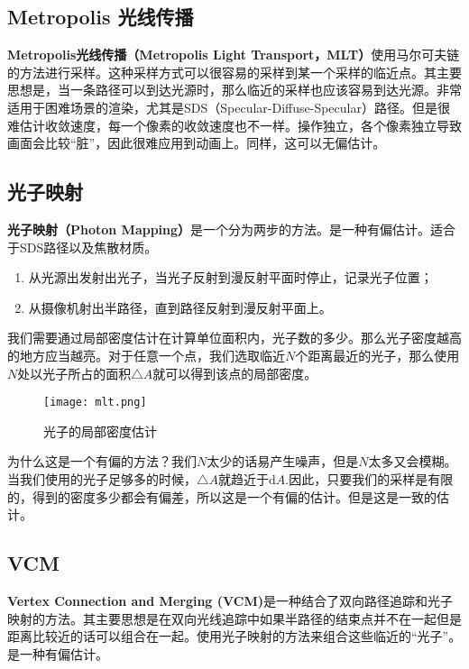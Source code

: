 \documentclass[openany]{progbookcn}
\begin{document}
\subsection{Metropolis 光线传播}

\textbf{Metropolis光线传播（Metropolis Light Transport，MLT）}使用马尔可夫链的方法进行采样。这种采样方式可以很容易的采样到某一个采样的临近点。其主要思想是，当一条路径可以到达光源时，那么临近的采样也应该容易到达光源。非常适用于困难场景的渲染，尤其是SDS（Specular-Diffuse-Specular）路径。但是很难估计收敛速度，每一个像素的收敛速度也不一样。操作独立，各个像素独立导致画面会比较``脏”，因此很难应用到动画上。同样，这可以无偏估计。

\subsection{光子映射}

\textbf{光子映射（Photon Mapping）}是一个分为两步的方法。是一种有偏估计。适合于SDS路径以及焦散材质。
\begin{enumerate}
	\item 从光源出发射出光子，当光子反射到漫反射平面时停止，记录光子位置；
	\item 从摄像机射出半路径，直到路径反射到漫反射平面上。
\end{enumerate}

我们需要通过局部密度估计在计算单位面积内，光子数的多少。那么光子密度越高的地方应当越亮。对于任意一个点，我们选取临近$N$个距离最近的光子，那么使用$N$处以光子所占的面积$\triangle A$就可以得到该点的局部密度。

\begin{figure}[H]
	\centering
	\texttt{[image: mlt.png]}
	\caption{光子的局部密度估计}
	\label{fig:mlt}
\end{figure}

为什么这是一个有偏的方法？我们$N$太少的话易产生噪声，但是$N$太多又会模糊。当我们使用的光子足够多的时候，$\triangle A$就趋近于$\text{d}A$.因此，只要我们的采样是有限的，得到的密度多少都会有偏差，所以这是一个有偏的估计。但是这是一致的估计。

\subsection{VCM}

\textbf{Vertex Connection and Merging (VCM)}是一种结合了双向路径追踪和光子映射的方法。其主要思想是在双向光线追踪中如果半路径的结束点并不在一起但是距离比较近的话可以组合在一起。使用光子映射的方法来组合这些临近的``光子”。是一种有偏估计。
\end{document}
